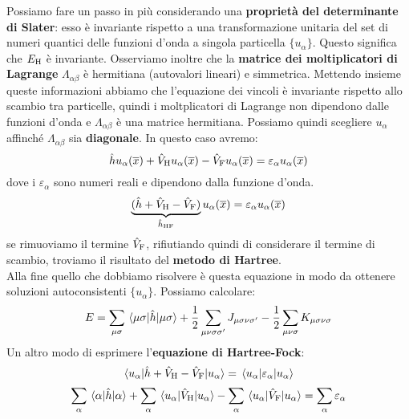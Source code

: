Possiamo fare un passo in più considerando una \textbf{proprietà del determinante di Slater}: esso è invariante rispetto a una transformazione unitaria del set di numeri quantici delle funzioni d'onda a singola particella $\{u_\alpha\}$. Questo significa che $E_{\text H}$ è invariante. Osserviamo inoltre che la \textbf{matrice dei moltiplicatori di Lagrange} $\Lambda_{\alpha\beta}$ è hermitiana (autovalori lineari) e simmetrica. Mettendo insieme queste informazioni abbiamo che l'equazione dei vincoli è invariante rispetto allo scambio tra particelle, quindi i moltplicatori di Lagrange non dipendono dalle funzioni d'onda e $\Lambda_{\alpha\beta}$ è una matrice hermitiana. Possiamo quindi scegliere $u_\alpha$ affinché $\Lambda_{\alpha\beta}$ sia \textbf{diagonale}. In questo caso avremo:
\begin{equation*}
    \hat h u_\alpha(\overline x)+\hat V_{\text H}u_\alpha(\overline x)-\hat V_{\text F}u_\alpha(\overline x)=\varepsilon_\alpha u_\alpha(\overline x)
\end{equation*}
dove i $\varepsilon_\alpha$ sono numeri reali e dipendono dalla funzione d'onda.
\begin{equation*}
    \underbrace{(\hat h + \hat V_{\text H} - \hat V_{\text F})}_{\hat h_{\text{HF}}}u_\alpha(\overline x)=\varepsilon_\alpha u_\alpha(\overline x)
\end{equation*}
se rimuoviamo il termine $\hat V_{\text F}$, rifiutiando quindi di considerare il termine di scambio, troviamo il risultato del \textbf{metodo di Hartree}. \\
Alla fine quello che dobbiamo risolvere è questa equazione in modo da ottenere soluzioni autoconsistenti $\{u_\alpha\}$. Possiamo calcolare:
\begin{equation*}
    E=\sum_{\mu\sigma}\mel{\mu\sigma}{\hat h}{\mu\sigma}+\frac 12 \sum_{\mu\nu\sigma\sigma'}J_{\mu\sigma\nu\sigma'}-\frac 12 \sum_{\mu\nu\sigma}K_{\mu\sigma\nu\sigma}
\end{equation*}
Un altro modo di esprimere l'\textbf{equazione di Hartree-Fock}:
\begin{equation*}
    \mel{u_\alpha}{\hat h + \hat V_{\text H} - \hat V_{\text F}}{u_\alpha}=\mel{u_\alpha}{\varepsilon_\alpha}{u_\alpha}
\end{equation*}
\begin{equation*}
    \sum_\alpha\mel{\alpha}{\hat h}{\alpha}+\sum_\alpha\mel{u_\alpha}{\hat V_{\text H}}{u_\alpha}-\sum_\alpha\mel{u_\alpha}{\hat V_{\text F}}{u_\alpha}=\sum_\alpha\varepsilon_\alpha
\end{equation*}
